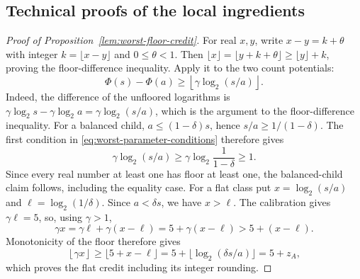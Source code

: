

\subsection{Technical proofs of the local ingredients}

\begin{proof}[Proof of Proposition~\ref{lem:worst-floor-credit}]
For real $x,y$, write $x-y=k+\theta$ with integer
$k=\lfloor x-y\rfloor$ and $0\le\theta<1$. Then
$\lfloor x\rfloor=\lfloor y+k+\theta\rfloor
\ge\lfloor y\rfloor+k$, proving the floor-difference inequality.
Apply it to the two count potentials:
\[
 \Phi(s)-\Phi(a)
 \ge\left\lfloor\gamma\log_2(s/a)\right\rfloor.
\]
Indeed, the difference of the unfloored logarithms is
$\gamma\log_2s-\gamma\log_2a=\gamma\log_2(s/a)$, which is the
argument to the floor-difference inequality. For a balanced child,
$a\le(1-\delta)s$, hence $s/a\ge1/(1-\delta)$. The first
condition in \eqref{eq:worst-parameter-conditions} therefore gives
\[
 \gamma\log_2(s/a)
 \ge\gamma\log_2\frac1{1-\delta}\ge1.
\]
Since every real number at least one has floor at least one, the
balanced-child claim follows, including the equality case.
For a flat class put $x=\log_2(s/a)$ and
 $\ell=\log_2(1/\delta)$. Since $a<\delta s$, we have $x>\ell$.
The calibration gives $\gamma\ell=5$, so, using $\gamma>1$,
\[
 \gamma x=\gamma\ell+\gamma(x-\ell)
          =5+\gamma(x-\ell)>5+(x-\ell).
\]
Monotonicity of the floor therefore gives
\[
 \left\lfloor\gamma x\right\rfloor
 \ge\lfloor5+x-\ell\rfloor
 =5+\lfloor\log_2(\delta s/a)\rfloor=5+z_A,
\]
which proves the flat credit including its integer rounding.
\end{proof}

